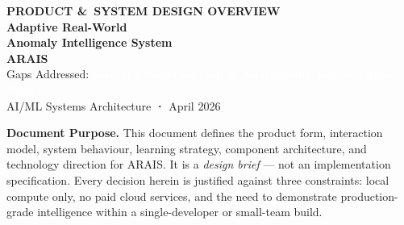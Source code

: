 \documentclass[11pt, a4paper]{article}
\begin{document}

\thispagestyle{empty}

\vspace*{1.6cm}
\begin{center}
  \begin{minipage}{0.94\linewidth}
    \centering
    {\fontsize{9}{11}\selectfont\color{darkline}\bfseries\MakeUppercase{Product \&\ System Design Overview}}\\[8pt]
    {\fontsize{22}{27}\selectfont\bfseries\color{white}
      Adaptive Real-World\\[4pt]Anomaly Intelligence System}\\[6pt]
    {\fontsize{13}{16}\selectfont\color{accent!70!white}\bfseries ARAIS}\\[16pt]
    {\small\color{darkline}
      Gaps Addressed:\quad
      \colorbox{accent!80!black}{\textcolor{white}{\small\bfseries Gap 1: Evaluation}}\;
      \colorbox{accentblue!90!black}{\textcolor{white}{\small\bfseries Gap 2: Adaptability}}\;
      \colorbox{accentamber!90!black}{\textcolor{white}{\small\bfseries Gap 6: Open-World}}
    }\\[18pt]
    {\small\color{subtle} AI/ML Systems Architecture \textbf{·} April 2026}
  \end{minipage}
\end{center}
\vfill

\begin{darkbox}
\noindent\textbf{\color{primary}Document Purpose.}\quad
This document defines the product form, interaction model, system behaviour,
learning strategy, component architecture, and technology direction for ARAIS.
It is a \textit{design brief} — not an implementation specification.
Every decision herein is justified against three constraints: local compute only,
no paid cloud services, and the need to demonstrate production-grade intelligence
within a single-developer or small-team build.
\end{darkbox}

\newpage
\end{document}
